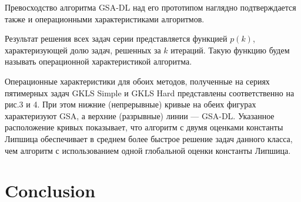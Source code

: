 \documentclass[runningheads]{llncs}
\begin{document}


Превосходство алгоритма GSA-DL над его прототипом наглядно подтверждается также и операционными характеристиками алгоритмов.  


Результат решения всех задач серии представляется функцией $p(k)$, характеризующей долю задач, решенных за $k$ итераций. Такую функцию будем называть операционной характеристикой алгоритма.

Операционные характеристики для обоих методов, полученные на сериях пятимерных задач GKLS Simple и GKLS Hard представлены соответственно на рис.3 и 4. При этом нижние (непрерывные) кривые на обеих фигурах характеризуют GSA, а верхние (разрывные) линии — GSA-DL.
Указанное расположение кривых показывает, что алгоритм с двумя оценками константы Липшица обеспечивает в среднем более быстрое решение задач данного класса, чем алгоритм с использованием одной глобальной оценки константы Липшица.

\section{Conclusion}



%
%




\end{document}
